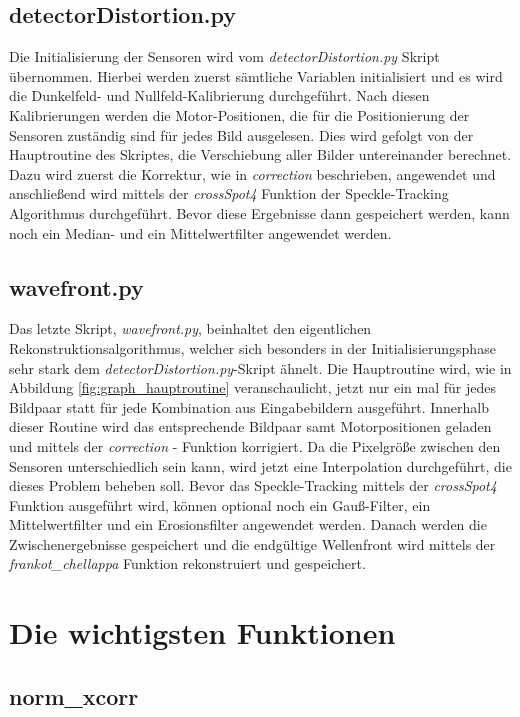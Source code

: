 \subsection{detectorDistortion.py}

Die Initialisierung der Sensoren wird vom \textit{detectorDistortion.py} Skript übernommen. Hierbei werden zuerst sämtliche Variablen initialisiert und es wird die Dunkelfeld- und Nullfeld-Kalibrierung durchgeführt. Nach diesen Kalibrierungen werden die Motor-Positionen, die für die Positionierung der Sensoren zuständig sind für jedes Bild ausgelesen. Dies wird gefolgt von der Hauptroutine des Skriptes, die Verschiebung aller Bilder untereinander berechnet. Dazu wird zuerst die Korrektur, wie in \textit{correction} beschrieben, angewendet und anschließend wird mittels der \textit{crossSpot4} Funktion der Speckle-Tracking Algorithmus durchgeführt. Bevor diese Ergebnisse dann gespeichert werden, kann noch ein Median- und ein Mittelwertfilter angewendet werden. 

\subsection{wavefront.py}

Das letzte Skript, \textit{wavefront.py}, beinhaltet den eigentlichen Rekonstruktionsalgorithmus, welcher sich besonders in der Initialisierungsphase sehr stark dem \textit{detectorDistortion.py}-Skript ähnelt. Die Hauptroutine wird, wie in Abbildung \ref{fig:graph_hauptroutine} veranschaulicht, jetzt nur ein mal für jedes Bildpaar statt für jede Kombination aus Eingabebildern ausgeführt. Innerhalb dieser Routine wird das entsprechende Bildpaar samt Motorpositionen geladen und mittels der \textit{correction} - Funktion korrigiert. Da die Pixelgröße zwischen den Sensoren unterschiedlich sein kann, wird jetzt eine Interpolation durchgeführt, die dieses Problem beheben soll. Bevor das Speckle-Tracking mittels der \textit{crossSpot4} Funktion ausgeführt wird, können optional noch ein Gauß-Filter, ein Mittelwertfilter und ein Erosionsfilter angewendet werden. Danach werden die Zwischenergebnisse gespeichert und die endgültige Wellenfront wird mittels der \textit{frankot\_chellappa} Funktion rekonstruiert und gespeichert. 

\section{Die wichtigsten Funktionen}

\subsection{norm\_xcorr}

